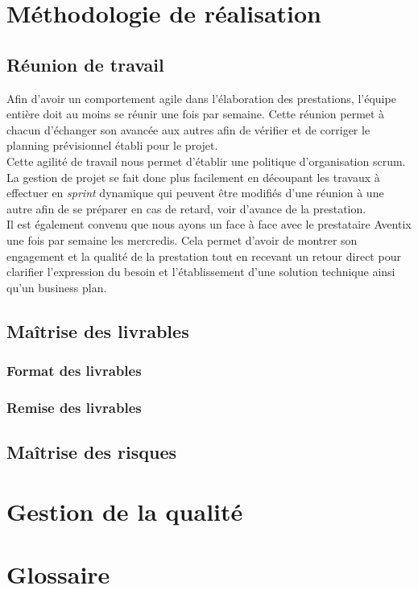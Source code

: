 \documentclass[11pt, a4paper]{article}
\begin{document}
\section{Méthodologie de réalisation}
\subsection{Réunion de travail}
Afin d'avoir un comportement agile dans l'élaboration des prestations, l'équipe
entière doit au moins se réunir une fois par semaine.
Cette réunion permet à chacun d'échanger son avancée aux autres afin de
vérifier et de corriger le planning prévisionnel établi pour le projet. \\

Cette agilité de travail nous permet d'établir une politique d'organisation scrum.
La gestion de projet se fait donc plus facilement en découpant les travaux à
effectuer en \textit{sprint} dynamique qui peuvent être modifiés d'une réunion
à une autre afin de se préparer en cas de retard, voir d'avance de la
prestation. \\

Il est également convenu que nous ayons un face à face avec le prestataire
Aventix une fois par semaine les mercredis. Cela permet d'avoir de montrer son
engagement et la qualité de la prestation tout en recevant un retour direct
pour clarifier l'expression du besoin et l'établissement d'une solution
technique ainsi qu'un business plan. \\

\subsection{Maîtrise des livrables}
\subsubsection{Format des livrables}

\subsubsection{Remise des livrables}

\subsection{Maîtrise des risques}

\section{Gestion de la qualité}

\section{Glossaire}
\end{document}
